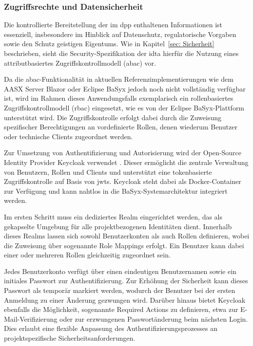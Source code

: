 \subsubsection{Zugriffsrechte und Datensicherheit}

Die kontrollierte Bereitstellung der im \acs{dpp} enthaltenen Informationen ist essenziell, insbesondere im Hinblick auf Datenschutz, regulatorische Vorgaben sowie den Schutz geistigen Eigentums.  
Wie in Kapitel~\ref{sec: Sicherheit} beschrieben, sieht die Security-Spezifikation der \acs{idta} hierfür die Nutzung eines attributbasiertes Zugriffskontrollmodell (\acs{abac}) vor.

Da die \acs{abac}-Funktionalität in aktuellen Referenzimplementierungen wie dem AASX Server Blazor oder Eclipse BaSyx jedoch noch nicht vollständig verfügbar ist, wird im Rahmen dieses Anwendungsfalls exemplarisch ein rollenbasiertes Zugriffskontrollmodell (\acs{rbac}) eingesetzt, wie es von der Eclipse BaSyx-Plattform unterstützt wird.  
Die Zugriffskontrolle erfolgt dabei durch die Zuweisung spezifischer Berechtigungen an vordefinierte Rollen, denen wiederum Benutzer oder technische Clients zugeordnet werden.

Zur Umsetzung von Authentifizierung und Autorisierung wird der Open-Source Identity Provider Keycloak verwendet \cite{Keycloak}.  
Dieser ermöglicht die zentrale Verwaltung von Benutzern, Rollen und Clients und unterstützt eine tokenbasierte Zugriffskontrolle auf Basis von \acsp{jwt}.  
Keycloak steht dabei als Docker-Container zur Verfügung und kann nahtlos in die BaSyx-Systemarchitektur integriert werden.

Im ersten Schritt muss ein dediziertes Realm eingerichtet werden, das als gekapselte Umgebung für alle projektbezogenen Identitäten dient.  
Innerhalb dieses Realms lassen sich sowohl Benutzerkonten als auch Rollen definieren, wobei die Zuweisung über sogenannte Role Mappings erfolgt.  
Ein Benutzer kann dabei einer oder mehreren Rollen gleichzeitig zugeordnet sein.

Jedes Benutzerkonto verfügt über einen eindeutigen Benutzernamen sowie ein initiales Passwort zur Authentifizierung.  
Zur Erhöhung der Sicherheit kann dieses Passwort als temporär markiert werden, wodurch der Benutzer bei der ersten Anmeldung zu einer Änderung gezwungen wird.  
Darüber hinaus bietet Keycloak ebenfalls die Möglichkeit, sogenannte Required Actions zu definieren, etwa zur E-Mail-Verifizierung oder zur erzwungenen Passwortänderung beim nächsten Login.  
Dies erlaubt eine flexible Anpassung des Authentifizierungsprozesses an projektspezifische Sicherheitsanforderungen.

